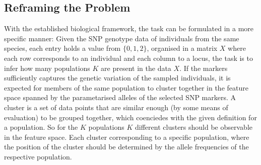 \documentclass[a4paper, 11pt]{article}
\begin{document}
\subsection{Reframing the Problem}
With the established biological framework, the task can be formulated in a more specific manner: Given the SNP genotype data of individuals from the same species, each entry holds a value from $\{0,1,2\}$, organised in a matrix $X$ where each row corresponds to an individual and each column to a locus, the task is to infer how many populations $K$ are present in the data $X$. If the markers sufficiently captures the genetic variation of the sampled individuals, it is expected for members of the same population to cluster together in the feature space spanned by the parametarised alleles of the selected SNP markers. A cluster is a set of data points that are similar enough (by some means of evaluation) to be grouped together, which coenciedes with the given definition for a population. So for the $K$ populations $K$ different clusters should be observable in the feature space. Each cluster corresponding to a specific population, where the position of the cluster should be determined by the allele frequencies of the respective population.\\
\end{document}
